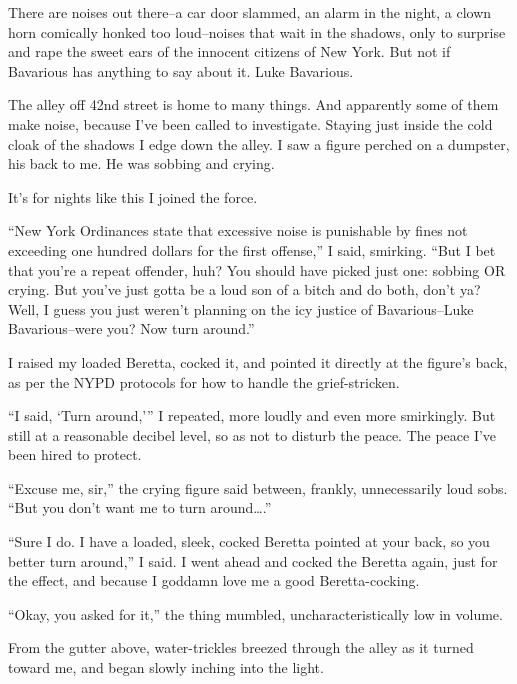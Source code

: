 There are noises out there--a car door slammed, an alarm in the
night, a clown horn comically honked too loud--noises that wait in
the shadows, only to surprise and rape the sweet ears of the
innocent citizens of New York. But not if Bavarious has anything to
say about it. Luke Bavarious.



The alley off 42nd street is home to many things. And apparently
some of them make noise, because I've been called to
investigate. Staying just inside the cold cloak of the shadows I
edge down the alley. I saw a figure perched on a dumpster, his back
to me. He was sobbing and crying.



It's for nights like this I joined the force.



``New York Ordinances state that excessive noise is punishable
by fines not exceeding one hundred dollars for the first
offense,'' I said, smirking. ``But I bet that
you're a repeat offender, huh? You should have picked just
one: sobbing OR crying. But you've just gotta be a loud son
of a bitch and do both, don't ya? Well, I guess you just
weren't planning on the icy justice of Bavarious--Luke
Bavarious--were you? Now turn around.''



I raised my loaded Beretta, cocked it, and pointed it directly at
the figure's back, as per the NYPD protocols for how to
handle the grief-stricken.



``I said, `Turn around,''' I repeated, more
loudly and even more smirkingly. But still at a reasonable decibel
level, so as not to disturb the peace. The peace I've been
hired to protect.



``Excuse me, sir,'' the crying figure said between,
frankly, unnecessarily loud sobs. ``But you don't want
me to turn around{\ldots}.''



``Sure I do. I have a loaded, sleek, cocked Beretta pointed at
your back, so you better turn around,'' I said. I went ahead
and cocked the Beretta again, just for the effect, and because I
goddamn love me a good Beretta-cocking.



``Okay, you asked for it,'' the thing mumbled,
uncharacteristically low in volume.



From the gutter above, water-trickles breezed through the alley as
it turned toward me, and began slowly inching into the light.



